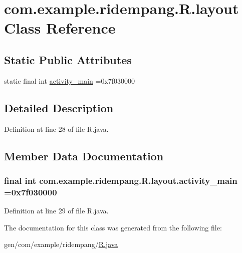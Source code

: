 \hypertarget{classcom_1_1example_1_1ridempang_1_1_r_1_1layout}{\section{com.\-example.\-ridempang.\-R.\-layout Class Reference}
\label{classcom_1_1example_1_1ridempang_1_1_r_1_1layout}
}
\subsection*{Static Public Attributes}
\begin{DoxyCompactItemize}
\item 
static final int \hyperlink{classcom_1_1example_1_1ridempang_1_1_r_1_1layout_a982092ba1b80a8d417d1e22fe6d20671}{activity\-\_\-main} =0x7f030000
\end{DoxyCompactItemize}


\subsection{Detailed Description}


Definition at line 28 of file R.\-java.



\subsection{Member Data Documentation}
\hypertarget{classcom_1_1example_1_1ridempang_1_1_r_1_1layout_a982092ba1b80a8d417d1e22fe6d20671}{
\subsubsection[{activity\-\_\-main}]{\setlength{\rightskip}{0pt plus 5cm}final int com.\-example.\-ridempang.\-R.\-layout.\-activity\-\_\-main =0x7f030000\hspace{0.3cm}{\ttfamily [static]}}}\label{classcom_1_1example_1_1ridempang_1_1_r_1_1layout_a982092ba1b80a8d417d1e22fe6d20671}


Definition at line 29 of file R.\-java.



The documentation for this class was generated from the following file\-:\begin{DoxyCompactItemize}
\item 
gen/com/example/ridempang/\hyperlink{_r_8java}{R.\-java}\end{DoxyCompactItemize}
